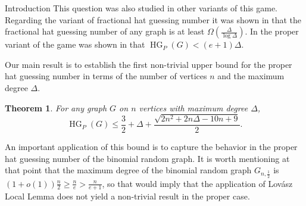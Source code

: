 \documentclass[11pt, letterpaper]{article}
\theoremstyle{plain}
\theoremstyle{plain}
\newtheorem{theorem}{Theorem}[section]
\begin{document}
\begin{section}{Introduction}
This question was also studied in other variants of this game. Regarding the variant of fractional hat guessing number it was shown in \cite{blavzej2023bears} that the fractional hat guessing number of any graph is at least $\Omega\left(\frac{\Delta}{\log\Delta}\right)$. In the proper variant of the game was shown in  \cite{adriaensen2026hatguessingpropercolorings} that $\operatorname{HG}_{P}(G) < (e+1)\Delta$.

\vspace{1em}

Our main result is to establish the first non-trivial upper bound for the proper hat guessing number in terms of the number of vertices \(n\) and the maximum degree $\Delta$.

\begin{theorem}\label{thm:main_bound}
For any graph $G$ on $n$ vertices with maximum degree $\Delta$, 
$$\operatorname{HG}_{P}(G) \leq \frac{3}{2}+ \Delta+ \frac{\sqrt{2n^{2}+2n\Delta-10n+9}}{2}. $$
\end{theorem}
An important application of this bound is to capture the behavior in the proper hat guessing number of the binomial random graph. It is worth mentioning at that point that the maximum degree of the binomial random graph $G_{n,\frac{1}{2}}$ is $(1+o(1))\frac{n}{2} \geq \frac{n}{e} > \frac{n}{e+1}$, so that would imply that the application of Lov\'{a}sz Local Lemma does not yield a non-trivial result in the proper case.


\end{section}
\end{document}
